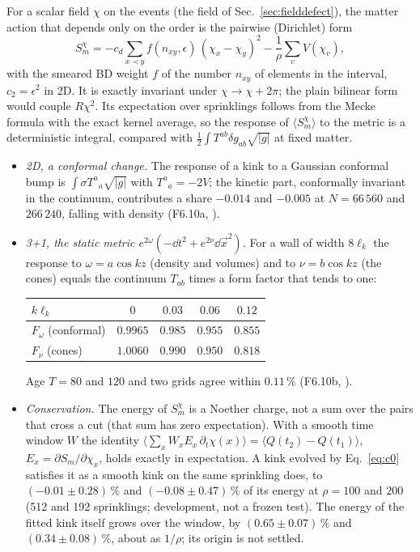 For a scalar field $\chi$ on the events (the field of Sec.~\ref{sec:fielddefect}), the matter action that depends only on the order is the pairwise
(Dirichlet) form
\begin{equation}\label{eq:smphi}
  S_m^\chi=-c_d\sum_{x\prec y}f(n_{xy},\epsilon)\,(\chi_x-\chi_y)^2-\frac1\rho\sum_vV(\chi_v),
\end{equation}
with the smeared BD weight $f$ of the number $n_{xy}$ of elements in the interval, $c_2=\epsilon^2$ in 2D. It is
exactly invariant under $\chi\to\chi+2\pi$; the plain bilinear form would couple $R\chi^2$. Its expectation over
sprinklings follows from the Mecke formula with the exact kernel average, so the response of $\langle S_m^\chi\rangle$
to the metric is a deterministic integral, compared with $\tfrac12\int T^{ab}\delta g_{ab}\sqrt{|g|}$ at fixed
matter.
\begin{itemize}
\item \emph{2D, a conformal change.} The response of a kink to a Gaussian conformal bump is $\int\sigma
  T^a{}_a\sqrt{|g|}$ with $T^a{}_a=-2V$; the kinetic part, conformally invariant in the continuum, contributes a
  share $-0.014$ and $-0.005$ at $N=66\,560$ and $266\,240$, falling with density (F6.10a, ).
\item \emph{3+1, the static metric $e^{2\omega}(-\dd t^2+e^{2\nu}\dd\vec x^2)$.} For a wall of width $8\ell_k$ the
  response to $\omega=a\cos kz$ (density and volumes) and to $\nu=b\cos kz$ (the cones) equals the continuum
  $T_{ab}$ times a form factor that tends to one:

  \begin{center}
  \begin{tabular}{lcccc}
  \toprule
  $k\ell_k$ & $0$ & $0.03$ & $0.06$ & $0.12$ \\
  \midrule
  $F_\omega$ (conformal) & $0.9965$ & $0.985$ & $0.955$ & $0.855$ \\
  $F_\nu$ (cones) & $1.0060$ & $0.990$ & $0.950$ & $0.818$ \\
  \bottomrule
  \end{tabular}
  \end{center}
  Age $T=80$ and $120$ and two grids agree within $0.11\,\%$ (F6.10b, ).
\item \emph{Conservation.} The energy of $S_m^\chi$ is a Noether charge, not a sum over the pairs that cross a cut
  (that sum has zero expectation). With a smooth time window $W$ the identity
  $\langle\sum_xW_xE_x\,\partial_t\chi(x)\rangle=\langle Q(t_2)-Q(t_1)\rangle$, $E_x=\partial S_m/\partial\chi_x$,
  holds exactly in expectation. A kink evolved by Eq.~\eqref{eq:c0} satisfies it as a smooth kink on the same
  sprinkling does, to $(-0.01\pm0.28)\,\%$ and $(-0.08\pm0.47)\,\%$ of its energy at $\rho=100$ and $200$ (512 and
  192 sprinklings; development, not a frozen test). The energy of the fitted kink itself grows over the window, by
  $(0.65\pm0.07)\,\%$ and $(0.34\pm0.08)\,\%$, about as $1/\rho$; its origin is not settled.
\end{itemize}

